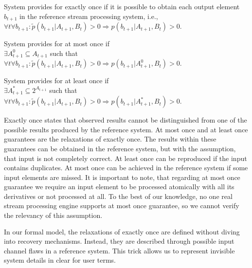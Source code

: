 \begin{definition}{System provides for exactly once}
if it is possible to obtain each output element $b_{t+1}$ in the reference stream processing system, i.e.,\\ 
$\forall{t} \forall{b_{t+1}}: \widetilde{p}(b_{t+1}|A_{t+1},B_t)>0 \Rightarrow p(b_{t+1}|A_{t+1},B_t)>0$.
\end{definition}

\begin{definition}{System provides for at most once}
if \\
$\exists{A^{0}_{t+1}\subseteq{A_{t+1}}}$ such that \\
$\forall{t} \forall{b_{t+1}}: \widetilde{p}(b_{t+1}|A_{t+1},B_t)>0 \Rightarrow p(b_{t+1}|A^{0}_{t+1},B_t)>0$.
\end{definition}

\begin{definition}{System provides for at least once}
if \\
$\exists{A^{*}_{t+1}\subseteq{2^{A_{t+1}}}}$ such that \\
$\forall{t} \forall{b_{t+1}}: \widetilde{p}(b_{t+1}|A_{t+1},B_t)>0 \Rightarrow p(b_{t+1}|A^{*}_{t+1},B_t)>0$.
\end{definition}

Exactly once states that observed results cannot be distinguished from one of the possible results produced by the reference system. At most once and at least once guarantees are the relaxations of exactly once. The results within these guarantees can be obtained in the reference system, but with the assumption, that input is not completely correct. At least once can be reproduced if the input contains duplicates. At most once can be achieved in the reference system if some input elements are missed. It is important to note, that regarding at most once guarantee we require an input element to be processed atomically with all its derivatives or not processed at all. To the best of our knowledge, no one real stream processing engine supports at most once guarantee, so we cannot verify the relevancy of this assumption. 


In our formal model, the relaxations of exactly once are defined without diving into recovery mechanisms. Instead, they are described through possible input channel flaws in a reference system. This trick allows us to represent invisible system details in clear for user terms.

